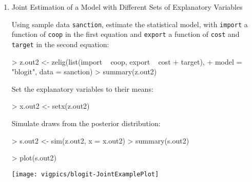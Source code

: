 \documentclass{article}
\begin{document}
\begin{enumerate}
\item {Joint Estimation of a Model with Different Sets of Explanatory Variables}\label{sto.dep.logit}

Using sample data \texttt{sanction}, estimate the statistical model, 
with {\tt import} a function of {\tt coop} in the first equation and {\tt export} a 
function of {\tt cost} and {\tt target} in the second equation:
\begin{Schunk}
\begin{Sinput}
> z.out2 <- zelig(list(import ~ coop, export ~ cost + target), 
+     model = "blogit", data = sanction)
> summary(z.out2)
\end{Sinput}
\end{Schunk}
Set the explanatory variables to their means:
\begin{Schunk}
\begin{Sinput}
> x.out2 <- setx(z.out2)
\end{Sinput}
\end{Schunk}
Simulate draws from the posterior distribution:
\begin{Schunk}
\begin{Sinput}
> s.out2 <- sim(z.out2, x = x.out2)
> summary(s.out2)
\end{Sinput}
\end{Schunk}
\begin{center}
\begin{Schunk}
\begin{Sinput}
> plot(s.out2)
\end{Sinput}
\end{Schunk}
\texttt{[image: vigpics/blogit-JointExamplePlot]}
\end{center}

%   


\end{enumerate}
\end{document}
